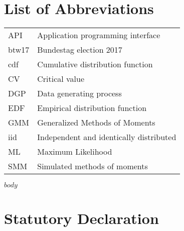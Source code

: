 \documentclass[a4paper, bibtotocnumbered,liststotoc,12pt,abstracton]{scrartcl}
\theoremstyle{definition}
\theoremstyle{remark}
\numberwithin{figure}{section}
\numberwithin{table}{section}
\numberwithin{equation}{section}
\begin{document}
\pagestyle{plain}
\newpage %
\tableofcontents %
\newpage
\listoffigures %
\listoftables %
\listofalgorithms
{}
\section*{List of Abbreviations}
\begin{tabular}{ll}
API & Application programming interface\\
btw17 & Bundestag election 2017 \\
cdf & Cumulative distribution function\\
CV & Critical value\\
DGP & Data generating process \\
EDF & Empirical distribution function\\
GMM & Generalized Methods of Moments\\
iid & Independent and identically distributed\\
ML & Maximum Likelihood \\
SMM & Simulated methods of moments\\
\end{tabular}
\newpage


\pagestyle{headings}

$body$


\newpage
\printbibliography




\newpage
\thispagestyle{plain}
\section{Statutory Declaration}
\end{document}
